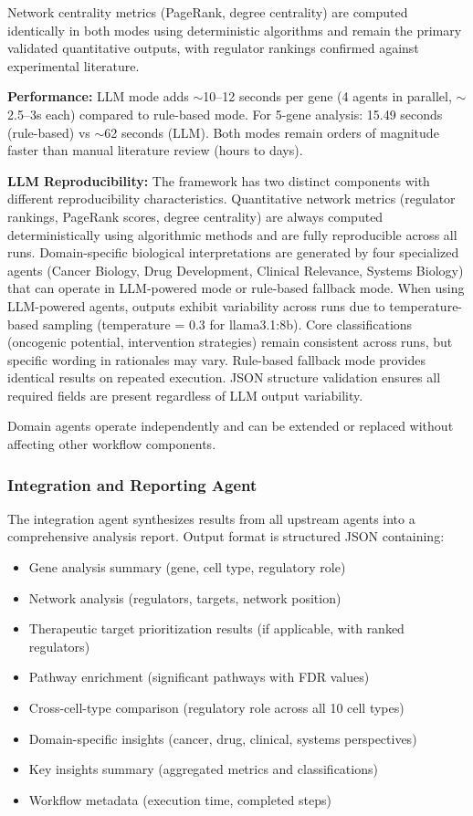 \documentclass[11pt]{article}
\begin{document}
Network centrality metrics (PageRank, degree centrality) are computed identically in both modes using deterministic algorithms and remain the primary validated quantitative outputs, with regulator rankings confirmed against experimental literature.

\textbf{Performance:} LLM mode adds $\sim$10--12 seconds per gene (4 agents in parallel, $\sim$2.5--3s each) compared to rule-based mode. For 5-gene analysis: 15.49 seconds (rule-based) vs $\sim$62 seconds (LLM). Both modes remain orders of magnitude faster than manual literature review (hours to days).

\textbf{LLM Reproducibility:} The framework has two distinct components with different reproducibility characteristics. Quantitative network metrics (regulator rankings, PageRank scores, degree centrality) are always computed deterministically using algorithmic methods and are fully reproducible across all runs. Domain-specific biological interpretations are generated by four specialized agents (Cancer Biology, Drug Development, Clinical Relevance, Systems Biology) that can operate in LLM-powered mode or rule-based fallback mode. When using LLM-powered agents, outputs exhibit variability across runs due to temperature-based sampling (temperature = 0.3 for llama3.1:8b). Core classifications (oncogenic potential, intervention strategies) remain consistent across runs, but specific wording in rationales may vary. Rule-based fallback mode provides identical results on repeated execution. JSON structure validation ensures all required fields are present regardless of LLM output variability.

Domain agents operate independently and can be extended or replaced without affecting other workflow components.

\subsubsection{Integration and Reporting Agent}

The integration agent synthesizes results from all upstream agents into a comprehensive analysis report. Output format is structured JSON containing:
\begin{itemize}
\item Gene analysis summary (gene, cell type, regulatory role)
\item Network analysis (regulators, targets, network position)
\item Therapeutic target prioritization results (if applicable, with ranked regulators)
\item Pathway enrichment (significant pathways with FDR values)
\item Cross-cell-type comparison (regulatory role across all 10 cell types)
\item Domain-specific insights (cancer, drug, clinical, systems perspectives)
\item Key insights summary (aggregated metrics and classifications)
\item Workflow metadata (execution time, completed steps)
\end{itemize}
\end{document}
